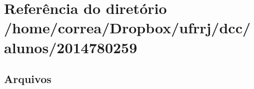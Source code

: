 \section{Referência do diretório /home/correa/\+Dropbox/ufrrj/dcc/alunos/2014780259}
\label{dir_f0ed0d3cdbad7a6e4f3d5ee4fdc107b2}
\subsection*{Arquivos}
\begin{DoxyCompactItemize}
\end{DoxyCompactItemize}
